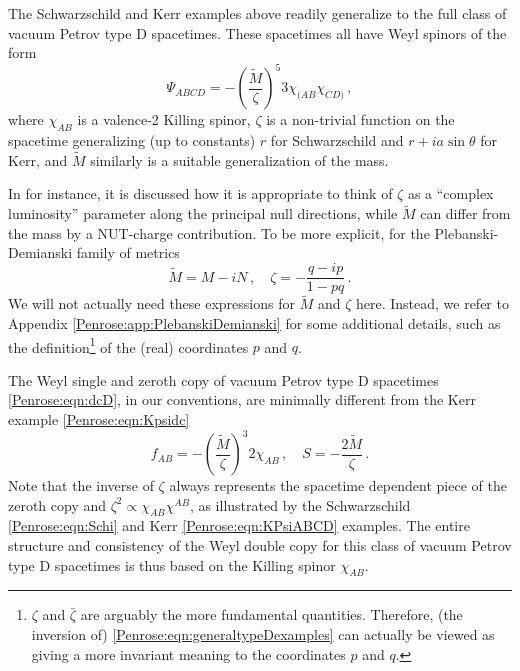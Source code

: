 The Schwarzschild and Kerr examples above readily generalize to the full class of vacuum Petrov type D spacetimes. These spacetimes all have Weyl spinors of the form \cite{penrose19952}
\begin{equation}\label{Penrose:eqn:dcD}
\Psi_{ABCD} = -\left(\frac{\tilde{M}}{\zeta}\right)^5 3 \chi_{(AB}\chi_{CD)} \, ,
\end{equation}
where $\chi_{AB}$ is a valence-2 Killing spinor, $\zeta$ is a non-trivial function on the spacetime generalizing (up to constants) $r$ for Schwarzschild and $r+i a \sin{\theta}$ for Kerr, and $\tilde{M}$ similarly is a suitable generalization of the mass.

 In \cite{penrose19952} for instance, it is discussed how it is appropriate to think of $\zeta$ as a ``complex luminosity'' parameter along the principal null directions, while $\tilde{M}$ can differ from the mass by a NUT-charge contribution. To be more explicit, for the Plebanski-Demianski family of metrics 
\begin{equation}\label{Penrose:eqn:generaltypeDexamples}
\tilde{M} = M-iN \, , \quad \zeta = -\frac{q-ip}{1-pq} \, .
\end{equation}
We will  not actually need these expressions for $\tilde{M}$ and $\zeta$ here. Instead, we refer to Appendix \ref{Penrose:app:PlebanskiDemianski} for some additional details, such as the definition\footnote{$\zeta$ and $\bar{\zeta}$ are arguably the more fundamental quantities. Therefore, (the inversion of) \eqref{Penrose:eqn:generaltypeDexamples} can actually be viewed as giving a more invariant meaning to the coordinates $p$ and $q$.} of the (real) coordinates $p$ and $q$. 

The Weyl single and zeroth copy of vacuum Petrov type D spacetimes \eqref{Penrose:eqn:dcD}, in our conventions, are minimally different from the Kerr example \eqref{Penrose:eqn:Kpsidc} 
\begin{equation}\label{Penrose:eqn:zcD}
f_{AB} = -\left(\frac{\tilde{M}}{\zeta}\right)^3 2 \chi_{AB} \, , \quad S = - \frac{2 \tilde{M}}{\zeta} \, .
\end{equation}
Note that the inverse of $\zeta$ always represents the spacetime dependent piece of the zeroth copy and $\zeta^2 \propto \chi_{AB} \chi^{AB}$, as illustrated by the Schwarzschild \eqref{Penrose:eqn:Schi} and Kerr \eqref{Penrose:eqn:KPsiABCD} examples. The entire structure and consistency of the Weyl double copy for this class of vacuum Petrov type D spacetimes is thus based on the Killing spinor $\chi_{AB}$.

